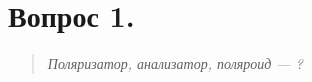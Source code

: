 

\newpage
{}
\section*{Вопрос 1.}
\begin{quote}
    \textit{Поляризатор, анализатор, поляроид --- ?}
\end{quote}

